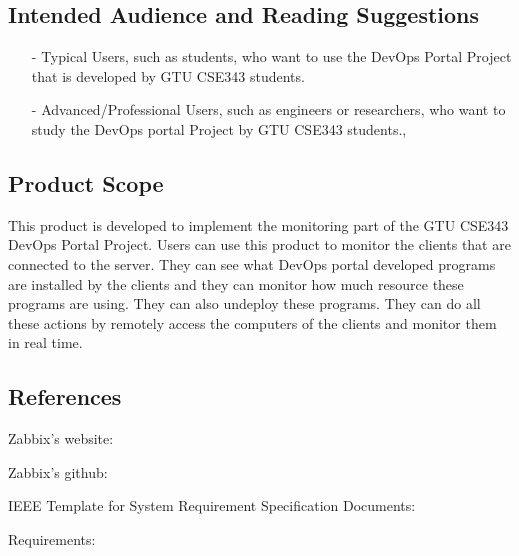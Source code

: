\documentclass{article}
\newcommand{\MYhref}[3][blue]{\href{#2}{\color{#1}{#3}}}%
\begin{document}
\subsection{ 
	Intended Audience and Reading Suggestions}
\flushleft 
\begin{itemize}
	\item[-] 
	Typical Users, such as students, who want to use the DevOps Portal Project that is developed by GTU CSE343 students.
	\item[-] Advanced/Professional Users, such as engineers or researchers, who want to study the DevOps portal Project by  GTU CSE343 students.,
\end{itemize}

\subsection{Product Scope}
This product is developed to implement the monitoring part of the GTU CSE343 DevOps Portal Project. Users can use this product to monitor the clients that are connected to the server. They can see what DevOps portal developed programs are installed by the clients and they can monitor how much resource these programs are using. They can also undeploy these programs. They can do all these actions by remotely access the computers of the clients and monitor them in real time. 
\newline \newline 


\subsection{References}


Zabbix’s website:  \newline  \MYhref{https://www.zabbix.com}{https://www.zabbix.com} \newline

 Zabbix’s github:  \newline  \MYhref{ https://github.com/zabbix}{ https://github.com/zabbix} \newline

IEEE Template for System Requirement Specification Documents:  \newline  \MYhref{ https://goo.gl/nsUFwy}{https://goo.gl/nsUFwy} \newline

Requirements: \newline \MYhref{https://www.zabbix.com/documentation/3.0/manual/installation/requirements}{https://www.zabbix.com/documentation/3.0/manual/installation/requirements}	
%
%
\end{document}
